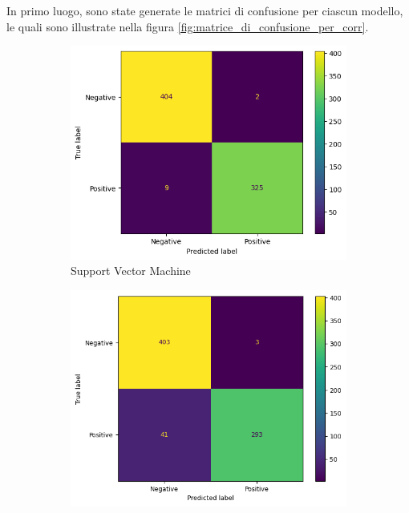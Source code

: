 In primo luogo, sono state generate le matrici di confusione per ciascun
modello, le quali sono illustrate nella figura \ref{fig:matrice_di_confusione_per_corr}.
\begin{figure}[!ht]
    \centering
    \begin{subfigure}{0.3\textwidth}
        \centering
        \includegraphics[width=\textwidth]{img/svm/matrice_confusione_corr.png}
        \caption{Support Vector Machine}
        \label{fig:matrice_di_confusione_per_SVM_corr}
    \end{subfigure}
    \hfill
    \begin{subfigure}{.3\textwidth}
        \centering
        \includegraphics[width=\textwidth]{img/gnb/confusion_matrix_corr.png}

\end{subfigure}
\end{figure}
